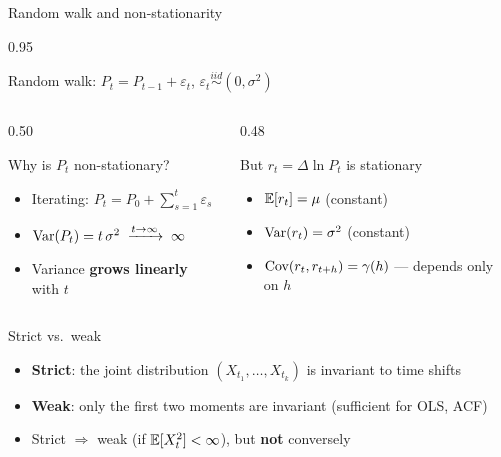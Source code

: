 \documentclass[9pt, aspectratio=169, t]{beamer}
\begin{document}
\begin{frame}[shrink=7]{Random walk and non-stationarity}
    \begin{cminipage}{0.95\textwidth}
    \begin{block}{Random walk: $P_t = P_{t-1} + \varepsilon_t$, \quad $\varepsilon_t \overset{iid}{\sim} (0, \sigma^2)$}
    \end{block}
    \begin{columns}[T]
    \begin{column}{0.50\textwidth}
    \begin{alertblock}{Why is $P_t$ non-stationary?}
    \begin{itemize}\setlength{\itemsep}{0pt}
        \item Iterating: $P_t = P_0 + \sum_{s=1}^{t} \varepsilon_s$
        \item $\text{Var}(P_t) = t\,\sigma^2 \;\xrightarrow{t\to\infty}\; \infty$
        \item Variance \textbf{grows linearly} with $t$
    \end{itemize}
    \end{alertblock}
    \end{column}
    \begin{column}{0.48\textwidth}
    \begin{exampleblock}{But $r_t = \Delta \ln P_t$ is stationary}
    \begin{itemize}\setlength{\itemsep}{0pt}
        \item $\mathbb{E}[r_t] = \mu$ (constant)
        \item $\text{Var}(r_t) = \sigma^2$ (constant)
        \item $\text{Cov}(r_t, r_{t+h}) = \gamma(h)$ --- depends only on $h$
    \end{itemize}
    \end{exampleblock}
    \end{column}
    \end{columns}
    \vspace{0.1cm}
    \begin{block}{Strict vs.\ weak}
    \begin{itemize}\setlength{\itemsep}{0pt}
        \item \textbf{Strict}: the joint distribution $(X_{t_1}, \ldots, X_{t_k})$ is invariant to time shifts
        \item \textbf{Weak}: only the first two moments are invariant (sufficient for OLS, ACF)
        \item Strict $\Rightarrow$ weak (if $\mathbb{E}[X_t^2] < \infty$), but \textbf{not} conversely
    \end{itemize}
    \end{block}
    \end{cminipage}
\end{frame}
\end{document}
